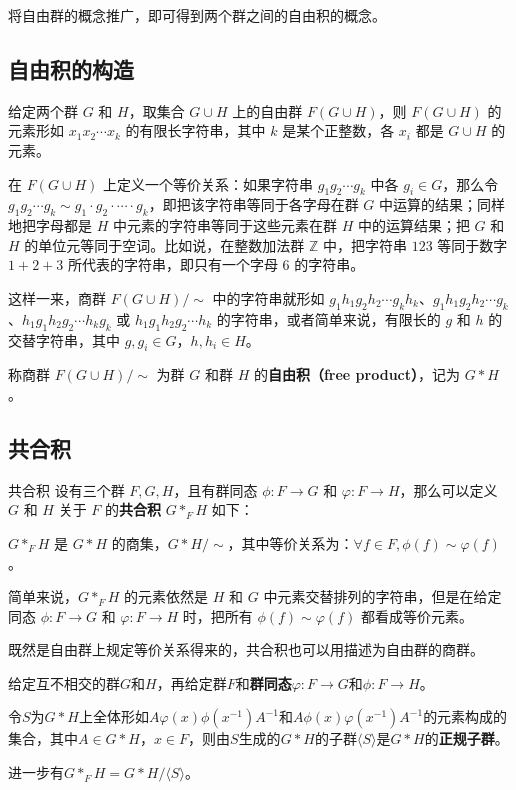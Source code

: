 
将自由群的概念推广，即可得到两个群之间的自由积的概念。

\subsection{自由积的构造}

给定两个群 $G$ 和 $H$，取集合 $G\cup H$ 上的自由群 $F(G\cup H)$，则 $F(G\cup H)$ 的元素形如 $x_1x_2\cdots x_k$ 的有限长字符串，其中 $k$ 是某个正整数，各 $x_i$ 都是 $G\cup H$ 的元素。

在 $F(G\cup H)$ 上定义一个等价关系：如果字符串 $g_1g_2\cdots g_k$ 中各 $g_i\in G$，那么令 $g_1g_2\cdots g_k\sim g_1\cdot g_2\cdot\cdots\cdot g_k$，即把该字符串等同于各字母在群 $G$ 中运算的结果；同样地把字母都是 $H$ 中元素的字符串等同于这些元素在群 $H$ 中的运算结果；把 $G$ 和 $H$ 的单位元等同于空词。比如说，在整数加法群 $\mathbb{Z}$ 中，把字符串 $123$ 等同于数字 $1+2+3$ 所代表的字符串，即只有一个字母 $6$ 的字符串。

这样一来，商群 $F(G\cup H)/\sim$ 中的字符串就形如 $g_1h_1g_2h_2\cdots g_kh_k$、$g_1h_1g_2h_2\cdots g_k$、$h_1g_1h_2g_2\cdots h_kg_k$ 或 $h_1g_1h_2g_2\cdots h_k$ 的字符串，或者简单来说，有限长的 $g$ 和 $h$ 的交替字符串，其中 $g, g_i\in G$，$h, h_i\in H$。

称商群 $F(G\cup H)/\sim$ 为群 $G$ 和群 $H$ 的\textbf{自由积（free product）}，记为 $G*H$。

\subsection{共合积}
\begin{definition}{共合积}
设有三个群 $F, G, H$，且有群同态 $\phi:F\rightarrow G$ 和 $\varphi:F\rightarrow H$，那么可以定义 $G$ 和 $H$ 关于 $F$ 的\textbf{共合积} $G*_FH$ 如下：

$G*_FH$ 是 $G*H$ 的商集，$G*H/\sim$，其中等价关系为：$\forall f\in F, \phi(f)\sim\varphi(f)$。
\end{definition}

简单来说，$G*_FH$ 的元素依然是 $H$ 和 $G$ 中元素交替排列的字符串，但是在给定同态 $\phi:F\rightarrow G$ 和 $\varphi:F\rightarrow H$ 时，把所有 $\phi(f)\sim\varphi(f)$ 都看成等价元素。




既然是自由群上规定等价关系得来的，共合积也可以用描述为自由群的商群。




\begin{theorem}{}

给定互不相交的群$G$和$H$，再给定群$F$和\textbf{群同态}$\varphi:F\to G$和$\phi: F\to H$。

令$S$为$G*H$上全体形如$A\varphi(x)\phi(x^{-1})A^{-1}$和$A\phi(x)\varphi(x^{-1})A^{-1}$的元素构成的集合，其中$A\in G*H$，$x\in F$，则由$S$生成的$G*H$的子群$\langle S \rangle$是$G*H$的\textbf{正规子群}。

进一步有$G*_FH=G*H/\langle S \rangle$。

\end{theorem}




